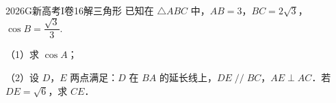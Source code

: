 
\begin{problem}{2026}{G}{新高考I卷}{16}{解三角形}
已知在 $ \triangle ABC $ 中，$ AB=3 $，$ BC=2\sqrt{3} $，$ \cos B=\dfrac{\sqrt{3}}{3} $.

（1）求 $ \cos A $；

（2）设 $ D $，$ E $ 两点满足：$ D $ 在 $ BA $ 的延长线上，$ DE\mathop{//} BC $，$ AE\perp AC $．若 $ DE=\sqrt{6} $，求 $ CE $．
\end{problem}

\begin{answer}

\end{answer}

\begin{solutions}

\end{solutions}